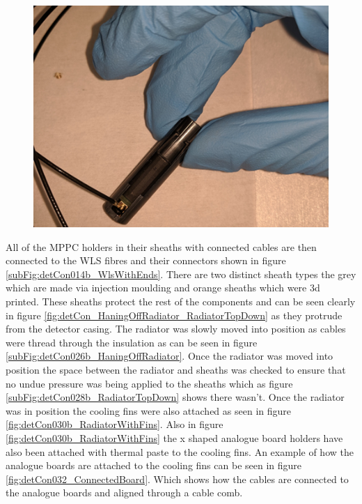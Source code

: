 \begin{figure}[htbp]
\centering
\includegraphics[width=0.8\linewidth]{Chapter3/Figs/Raster/detCon023b_HoldersConnectedZoom.png}
\label{fig:detCon023b_HoldersConnectedZoom}
\end{figure}

All of the MPPC holders in their sheaths with connected cables are then connected to the WLS fibres and their connectors shown in figure \ref{subFig:detCon014b_WlsWithEnds}. There are two distinct sheath types the grey which are made via injection moulding and orange sheaths which were 3d printed. These sheaths protect the rest of the components and can be seen clearly in figure \ref{fig:detCon_HaningOffRadiator_RadiatorTopDown} as they protrude from the detector casing. The radiator was slowly moved into position as cables were thread through the insulation as can be seen in figure \ref{subFig:detCon026b_HaningOffRadiator}. Once the radiator was moved into position the space between the radiator and sheaths was checked to ensure that no undue pressure was being applied to the sheaths which as figure \ref{subFig:detCon028b_RadiatorTopDown} shows there wasn't. Once the radiator was in position the cooling fins were also attached as seen in figure \ref{fig:detCon030b_RadiatorWithFins}. Also in figure \ref{fig:detCon030b_RadiatorWithFins} the x shaped analogue board holders have also been attached with thermal paste to the cooling fins. An example of how the analogue boards are attached to the cooling fins can be seen in figure \ref{fig:detCon032_ConnectedBoard}. Which shows how the cables are connected to the analogue boards and aligned through a cable comb. 

